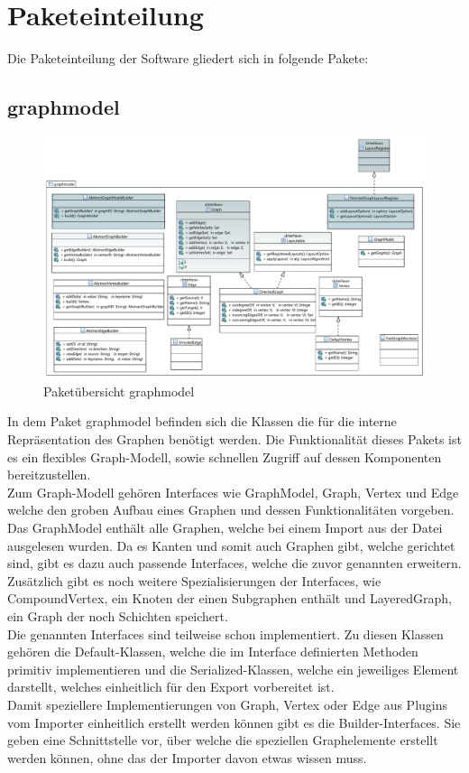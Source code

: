 \chapter{Paketeinteilung}
\label{ch:paketeinteilung}

Die Paketeinteilung der Software gliedert sich in folgende Pakete: %

\section{graphmodel}

\begin{figure}[hb]
  \centering
  \includegraphics[width=380pt]{resourcen/graphmodel.pdf}
  \caption{Paketübersicht graphmodel}
  \label{fig:packge_graphmodel}
\end{figure}

In dem Paket graphmodel befinden sich die Klassen die für die interne Repräsentation des Graphen benötigt werden. Die Funktionalität dieses Pakets ist es ein flexibles Graph-Modell, sowie schnellen Zugriff auf dessen Komponenten bereitzustellen.\\ 
Zum Graph-Modell gehören Interfaces wie GraphModel, Graph, Vertex und Edge welche den groben Aufbau eines Graphen und dessen Funktionalitäten vorgeben. Das GraphModel enthält alle Graphen, welche bei einem Import aus der Datei ausgelesen wurden. Da es Kanten und somit auch Graphen gibt, welche gerichtet sind, gibt es dazu auch passende Interfaces, welche die zuvor genannten erweitern. Zusätzlich gibt es noch weitere Spezialisierungen der Interfaces, wie CompoundVertex, ein Knoten der einen Subgraphen enthält und LayeredGraph, ein Graph der noch Schichten speichert.\\
Die genannten Interfaces sind teilweise schon implementiert. Zu diesen Klassen gehören die Default-Klassen, welche die im Interface definierten Methoden primitiv implementieren und die Serialized-Klassen, welche ein jeweiliges Element darstellt, welches einheitlich für den Export vorbereitet ist. \\
Damit speziellere Implementierungen von Graph, Vertex oder Edge aus Plugins vom Importer einheitlich erstellt werden können gibt es die Builder-Interfaces. Sie geben eine Schnittstelle vor, über welche die speziellen Graphelemente erstellt werden können, ohne das der Importer davon etwas wissen muss.

